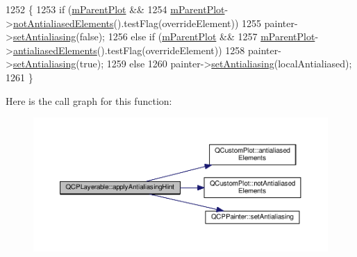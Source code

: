 \begin{DoxyCode}
1252                                                  \{
1253   \textcolor{keywordflow}{if} (\hyperlink{class_q_c_p_layerable_aa2a528433e44db02b8aef23c1f9f90ed}{mParentPlot} &&
1254       \hyperlink{class_q_c_p_layerable_aa2a528433e44db02b8aef23c1f9f90ed}{mParentPlot}->\hyperlink{class_q_custom_plot_a8060cee59757213764382a78d3196189}{notAntialiasedElements}().testFlag(overrideElement))
1255     painter->\hyperlink{class_q_c_p_painter_aaba1deb9188244d9ea65b035112b4d05}{setAntialiasing}(\textcolor{keyword}{false});
1256   \textcolor{keywordflow}{else} \textcolor{keywordflow}{if} (\hyperlink{class_q_c_p_layerable_aa2a528433e44db02b8aef23c1f9f90ed}{mParentPlot} &&
1257            \hyperlink{class_q_c_p_layerable_aa2a528433e44db02b8aef23c1f9f90ed}{mParentPlot}->\hyperlink{class_q_custom_plot_a81e954fbb485bb44c609e5707f0067b3}{antialiasedElements}().testFlag(overrideElement))
1258     painter->\hyperlink{class_q_c_p_painter_aaba1deb9188244d9ea65b035112b4d05}{setAntialiasing}(\textcolor{keyword}{true});
1259   \textcolor{keywordflow}{else}
1260     painter->\hyperlink{class_q_c_p_painter_aaba1deb9188244d9ea65b035112b4d05}{setAntialiasing}(localAntialiased);
1261 \}
\end{DoxyCode}


Here is the call graph for this function\+:\nopagebreak
\begin{figure}[H]
\begin{center}
\leavevmode
\includegraphics[width=350pt]{class_q_c_p_layerable_a62bd552d1a45aa9accb24b310542279e_cgraph}
\end{center}
\end{figure}





